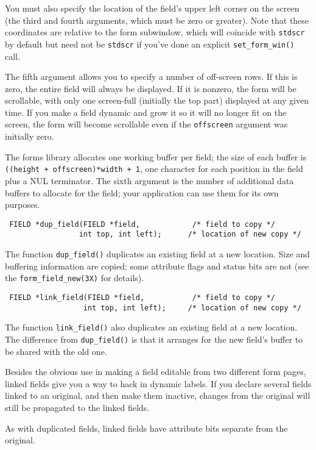 You must also specify the location of the field's upper left corner on
the screen (the third and fourth arguments, which must be zero or
greater). Note that these coordinates are relative to the form
subwindow, which will coincide with \texttt{stdscr} by default but
need not be \texttt{stdscr} if you've done an explicit
\texttt{set\_form\_win()} call. 

The fifth argument allows you to specify a number of off-screen rows.  If
this is zero, the entire field will always be displayed.  If it is
nonzero, the form will be scrollable, with only one screen-full (initially
the top part) displayed at any given time.  If you make a field dynamic
and grow it so it will no longer fit on the screen, the form will become
scrollable even if the \texttt{offscreen} argument was initially zero. 

The forms library allocates one working buffer per field; the size of
each buffer is \texttt{((height + offscreen)*width + 1}, one character
for each position in the field plus a NUL terminator.  The sixth
argument is the number of additional data buffers to allocate for the
field; your application can use them for its own purposes.
\begin{verbatim} FIELD *dup_field(FIELD *field,            /* field to copy */
                 int top, int left);      /* location of new copy */
\end{verbatim}
The function \texttt{dup\_field()} duplicates an existing field at a
new location.  Size and buffering information are copied; some
attribute flags and status bits are not (see the
\texttt{form\_field\_new(3X)} for details).
\begin{verbatim} FIELD *link_field(FIELD *field,           /* field to copy */
                  int top, int left);     /* location of new copy */
\end{verbatim}
The function \texttt{link\_field()} also duplicates an existing field
at a new location.  The difference from \texttt{dup\_field()} is that
it arranges for the new field's buffer to be shared with the old one. 

Besides the obvious use in making a field editable from two different
form pages, linked fields give you a way to hack in dynamic labels.  If
you declare several fields linked to an original, and then make them
inactive, changes from the original will still be propagated to the
linked fields. 

As with duplicated fields, linked fields have attribute bits separate
from the original. 

